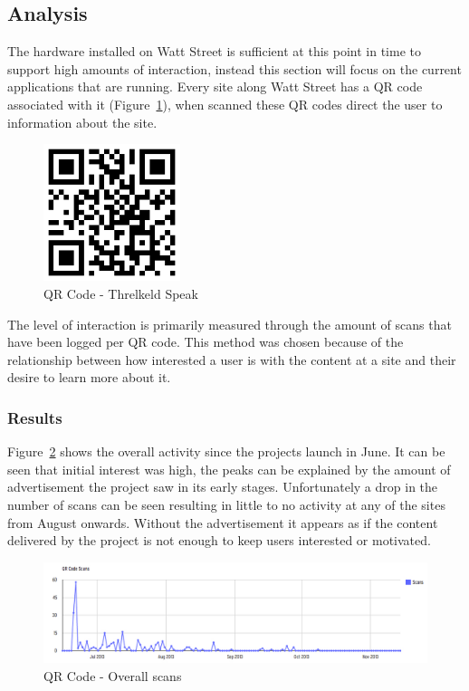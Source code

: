 \documentclass[a4paper,12pt]{article}
\begin{document}
\subsection{Analysis}
The hardware installed on Watt Street is sufficient at this point in time to support high amounts of interaction, instead this section will focus on the current applications that are running. 
Every site along Watt Street has a QR code associated with it (Figure~\ref{QR-threkeld-barcode}), when scanned these QR codes direct the user to information about the site. 
\begin{figure}[ht!]
	\centering
	\includegraphics[width=40mm]{./images/qrcode-threlkeld}
	\caption{QR Code - Threlkeld Speak}
	\label{QR-threkeld-barcode}
\end{figure}
The level of interaction is primarily measured through the amount of scans that have been logged per QR code. 
This method was chosen because of the relationship between how interested a user is with the content at a site and their desire to learn more about it.

\subsubsection{Results}
Figure~\ref{QR-overall-access-overTime} shows the overall activity since the projects launch in June. 
It can be seen that initial interest was high, the peaks can be explained by the amount of advertisement the project saw in its early stages. 
Unfortunately a drop in the number of scans can be seen resulting in little to no activity at any of the sites from August onwards.
Without the advertisement it appears as if the content delivered by the project is not enough to keep users interested or motivated.

\begin{figure}[ht!]
	\centering
	\includegraphics[width=150mm]{./images/OverallQRCodeDownload}
	\caption{QR Code - Overall scans}
	\label{QR-overall-access-overTime}
\end{figure}
\end{document}
